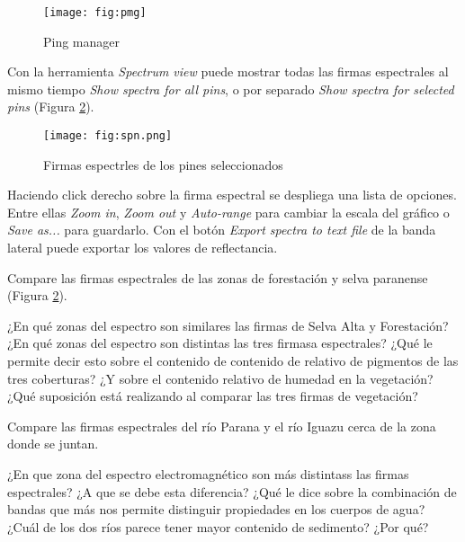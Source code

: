 \begin{figure}[h!]
    \centering
    \texttt{[image: fig:pmg]}
    \caption{Ping manager}
    \label{fig:pmg}
\end{figure}

Con la herramienta \emph{Spectrum view} puede mostrar todas las firmas espectrales al mismo tiempo \emph{Show spectra for all pins}, o por separado \emph{Show spectra for selected pins} (Figura \ref{fig:spn}).

\begin{figure}[h!]
    \centering
    \texttt{[image: fig:spn.png]}
    \caption{Firmas espectrles de los pines seleccionados}
    \label{fig:spn}
\end{figure}

Haciendo click derecho sobre la firma espectral se despliega una lista de opciones. Entre ellas \emph{Zoom in}, \emph{Zoom out} y \emph{Auto-range} para cambiar la escala del gráfico o \emph{Save as...} para guardarlo.
Con el botón \emph{Export spectra to text file} de la banda lateral puede exportar los valores de reflectancia.

Compare las firmas espectrales de las zonas de forestación y selva paranense (Figura \ref{fig:spn}).%

\begin{que}
    ¿En qué zonas del espectro son similares las firmas de Selva Alta %
    y Forestación? ¿En qué zonas del espectro son distintas las tres firmasa espectrales? ¿Qué le permite decir esto sobre el contenido de contenido de relativo de pigmentos de las tres coberturas? ¿Y sobre el contenido relativo de humedad en la vegetación? ¿Qué suposición está realizando al comparar las tres firmas de vegetación?
\end{que}

Compare las firmas espectrales del río Parana y el río Iguazu cerca de la zona donde se juntan.

\begin{que}
    ¿En que zona del espectro electromagnético son más distintass las firmas espectrales? ¿A que se debe esta diferencia? ¿Qué le dice sobre la combinación de bandas que más nos permite distinguir propiedades en los cuerpos de agua? ¿Cuál de los dos ríos parece tener mayor contenido de sedimento? ¿Por qué?
\end{que}
